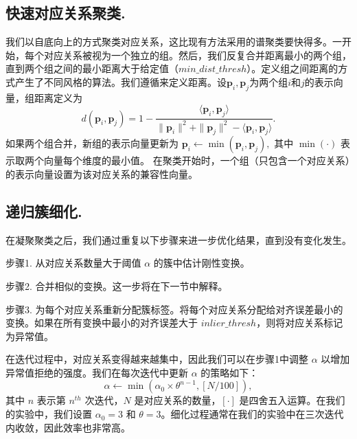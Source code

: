 \subsection{快速对应关系聚类.}
我们以自底向上的方式聚类对应关系，这比现有方法采用的谱聚类\cite{parra2019practical}\cite{shi2021robin}要快得多。一开始，每个对应关系被视为一个独立的组。然后，我们反复合并距离最小的两个组，直到两个组之间的最小距离大于给定值（$min\_dist\_thresh$）。定义组之间距离的方式产生了不同风格的算法。我们遵循\cite{Tlinkage}来定义距离。设$\mathbf{p}_i, \mathbf{p}_j$为两个组$i$和$j$的表示向量，组距离定义为
\begin{equation}
d(\mathbf{p}_i, \mathbf{p}_j)= 1-\frac{\langle \mathbf{p}_i,\mathbf{p}_j\rangle}{\parallel \mathbf{p}_i\parallel ^2+\parallel \mathbf{p}_j\parallel ^2-\langle \mathbf{p}_i,\mathbf{p}_j\rangle}.
\end{equation}
如果两个组合并，新组的表示向量更新为
$\mathbf{p}_i \leftarrow \min (\mathbf{p}_i, \mathbf{p}_j),$ 其中 $\min(\cdot)$ 表示取两个向量每个维度的最小值。
在聚类开始时，一个组（只包含一个对应关系）的表示向量设置为该对应关系的兼容性向量。

\subsection{递归簇细化.}
\label{sec:cluster_refinement}
在凝聚聚类之后，我们通过重复以下步骤来进一步优化结果，直到没有变化发生。

步骤1. 从对应关系数量大于阈值 $\alpha$ 的簇中估计刚性变换。

步骤2. 合并相似的变换。这一步将在下一节中解释。

步骤3. 为每个对应关系重新分配簇标签。将每个对应关系分配给对齐误差最小的变换。如果在所有变换中最小的对齐误差大于 $inlier\_thresh$，则将对应关系标记为异常值。

在迭代过程中，对应关系变得越来越集中，因此我们可以在步骤1中调整 $\alpha$ 以增加异常值拒绝的强度。我们在每次迭代中更新 $\alpha$ 的策略如下：
\begin{equation}
\alpha \leftarrow \min(\alpha _0\times \theta ^{n-1},\left[N/100 \right] ),
\label{eq:alpha}
\end{equation}
其中 $n$ 表示第 $n^{th}$ 次迭代，$N$ 是对应关系的数量，$\left[ \cdot \right]$ 是四舍五入运算。在我们的实验中，我们设置 $\alpha_0 = 3$ 和 $\theta = 3$。细化过程通常在我们的实验中在三次迭代内收敛，因此效率也非常高。

